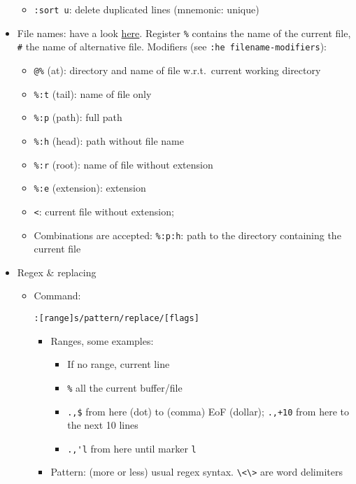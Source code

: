 \documentclass[a4paper,12pt,%
              final%
              ]{article}
\begin{document}
\begin{itemize}
\begin{itemize}
      \item \verb|:sort u|: delete duplicated lines (mnemonic: unique)
    \end{itemize}
  \item File names: have a look \href{https://vim.fandom.com/wiki/Get_the_name_of_the_current_file}{here}.
    Register \verb|%| contains the name of the current file, \verb|#| the name of alternative file.
    Modifiers (see \verb|:he filename-modifiers|):
    \begin{itemize}
      \item \verb|@%| (at): directory and name of file w.r.t.\ current working directory
      \item \verb|%:t| (tail): name of file only
      \item \verb|%:p| (path): full path
      \item \verb|%:h| (head): path without file name
      \item \verb|%:r| (root): name of file without extension
      \item \verb|%:e| (extension): extension
      \item \verb|<|: current file without extension;
      \item Combinations are accepted: \verb|%:p:h|: path to the directory containing the current file
    \end{itemize}
  \item Regex \& replacing
    \begin{itemize}
      \item Command:
\begin{verbatim}
:[range]s/pattern/replace/[flags]
\end{verbatim}
        \begin{itemize}
          \item Ranges, some examples:
            \begin{itemize}
              \item If no range, current line
              \item \verb|%| all the current buffer/file
              \item \verb|.,$| from here (dot) to (comma) EoF (dollar); \verb|.,+10|
                from here to the next 10 lines
              \item \verb|.,'l| from here until marker \texttt{l}
            \end{itemize}
          \item Pattern: (more or less) usual regex syntax. \verb|\<\>| are word
            delimiters

\end{itemize}
\end{itemize}
\end{itemize}
\end{document}
